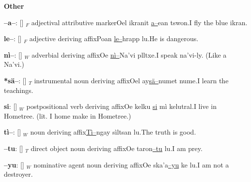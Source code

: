 \documentclass[11pt]{article}
\newcommand{\marker}[4]{\par\textbf{#1}: [\textipa{#2}] $_{#4}$ #3}
\newcommand{\infix}[5]{\par\textbf{#1}: [\textipa{#2}] $_{#5}$ #3 verbal infix in position #4}
\newcommand{\affect}[4]{\par\textbf{#1}: [\textipa{#2}] $_{#4}$ #3 affect verbal infix in position 3}
\newcommand{\affix}[5]{\par\textbf{#1}: [\textipa{#2}] $_{#5}$ #3 affix for #4}
\newcommand{\alloffix}[6]{\par\textbf{#1}: [\textipa{#2}] $_{#6}$ #4 suffix for nouns ending in a #5 (allomorph of \textbf{#3})}
\newcommand{\derivingaffix}[4]{\par\textbf{#1}: [\textipa{#2}] $_{#4}$ #3 deriving affix}
\newcommand{\infixcw}[7]{\par\textbf{#1}: [\textipa{#2}] $_{#7}$ #3 verbal infix in position #4, derived from \textbf{#5} + \textbf{#6}}
\begin{document}
\noindent\textbf{Other}\begin{multicols}{2}{\begin{hangparas}{.5cm}{1}\noindent
\marker{--a--}{a}{adjectival attributive marker}{F}{Oel ikranit \uline{a--}ean tswon.}{I fly the blue ikran.}
\derivingaffix{le--}{lE}{adjective}{F}{Poan \uline{le--}hrapp lu.}{He is dangerous.}
\derivingaffix{n\`i--}{nI}{adverbial}{W}{Oe \uline{n\`i--}Na'vi plltxe.}{I speak na'vi-ly. (Like a Na'vi.)}
\derivingaffix{*s\"a--}{s\ae}{instrumental noun}{T}{Oel ay\uline{s\"a--}numet nume.}{I learn the teachings.}
\derivingaffix{si}{si}{postpositional verb}{W}{Oe kelku \uline{si} m\`i kelutral.}{I live in Hometree. (lit. I home make in Hometree.)}
\derivingaffix{t\`i--}{tI}{noun}{W}{\uline{T\`i--}ngay s\`iltsan lu.}{The truth is good.}
\derivingaffix{--tu}{tu}{direct object noun}{T}{Oe taron\uline{--tu} lu.}{I am prey.}
\derivingaffix{--yu}{ju}{nominative agent noun}{W}{Oe ska'a\uline{--yu} ke lu.}{I am not a destroyer.}
\end{hangparas} }\end{multicols}
\newpage
\renewcommand{\infix}[5]{\par\textbf{#2}: #1. $_{#5}$ #3 verbal infix in position #4.}
\renewcommand{\affect}[4]{\par\textbf{#2}: #1. $_{#4}$ #3 affect verbal infix in position 3.}
\renewcommand{\infixcw}[5]{\par\textbf{#2}: #1. $_{#5}$ #3 verbal infix in position #4.}
\renewcommand{\affix}[5]{\par\textbf{#2}: #1. $_{#5}$ #3 affix for #4.}
\renewcommand{\alloffix}[6]{\par\textbf{#2}: #1. $_{#6}$ #4 suffix for nouns ending in a #5 (allomorph of \textbf{#3})}
\renewcommand{\derivingaffix}[4]{\par\textbf{#2}: #1. $_{#4}$ #3 deriving affix.}
\renewcommand{\marker}[4]{\par\textbf{#2}: #1. $_{#4}$ #3.}
\end{document}

